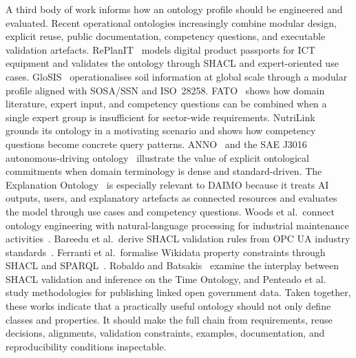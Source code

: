 \documentclass[11pt,a4paper]{article}
\begin{document}
A third body of work informs how an ontology profile should be engineered and evaluated. Recent operational ontologies increasingly combine modular design, explicit reuse, public documentation, competency questions, and executable validation artefacts. RePlanIT~\cite{kurteva} models digital product passports for ICT equipment and validates the ontology through SHACL and expert-oriented use cases. GloSIS~\cite{palma} operationalises soil information at global scale through a modular profile aligned with SOSA/SSN and ISO~28258. FATO~\cite{fato} shows how domain literature, expert input, and competency questions can be combined when a single expert group is insufficient for sector-wide requirements. NutriLink~\cite{nutrilink} grounds its ontology in a motivating scenario and shows how competency questions become concrete query patterns. ANNO~\cite{anno} and the SAE J3016 autonomous-driving ontology~\cite{sae-onto} illustrate the value of explicit ontological commitments when domain terminology is dense and standard-driven. The Explanation Ontology~\cite{explanation-ontology} is especially relevant to DAIMO because it treats AI outputs, users, and explanatory artefacts as connected resources and evaluates the model through use cases and competency questions. Woods et al.\ connect ontology engineering with natural-language processing for industrial maintenance activities~\cite{woods}. Bareedu et al.\ derive SHACL validation rules from OPC UA industry standards~\cite{bareedu24}. Ferranti et al.\ formalise Wikidata property constraints through SHACL and SPARQL~\cite{ferranti}. Robaldo and Batsakis~\cite{robaldo} examine the interplay between SHACL validation and inference on the Time Ontology, and Penteado et al.~\cite{penteado23} study methodologies for publishing linked open government data. Taken together, these works indicate that a practically useful ontology should not only define classes and properties. It should make the full chain from requirements, reuse decisions, alignments, validation constraints, examples, documentation, and reproducibility conditions inspectable.
\end{document}
